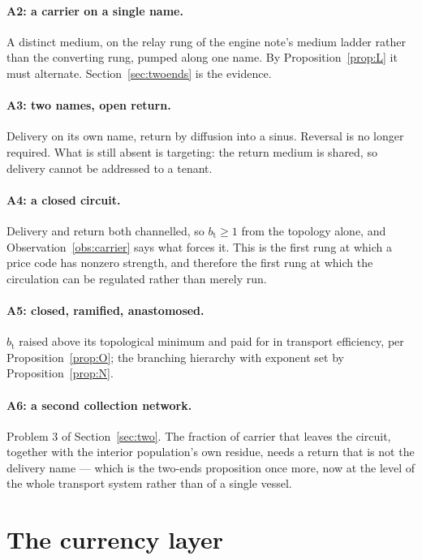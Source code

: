 \documentclass[11pt]{article}
\theoremstyle{plain}
\theoremstyle{definition}
\newcommand{\bt}{b_{\mathrm{t}}}
\begin{document}
\paragraph{A2: a carrier on a single name.} A distinct medium, on the relay rung of the engine note's
medium ladder rather than the converting rung, pumped along one name. By Proposition~\ref{prop:L} it
must alternate. Section~\ref{sec:twoends} is the evidence.

\paragraph{A3: two names, open return.} Delivery on its own name, return by diffusion into a sinus.
Reversal is no longer required. What is still absent is targeting: the return medium is shared, so
delivery cannot be addressed to a tenant.

\paragraph{A4: a closed circuit.} Delivery and return both channelled, so $\bt \geq 1$ from the
topology alone, and Observation~\ref{obs:carrier} says what forces it. This is the first rung at
which a price code has nonzero strength, and therefore the first rung at which the circulation can be
regulated rather than merely run.

\paragraph{A5: closed, ramified, anastomosed.} $\bt$ raised above its topological minimum and paid for
in transport efficiency, per Proposition~\ref{prop:O}; the branching hierarchy with exponent set by
Proposition~\ref{prop:N}.

\paragraph{A6: a second collection network.} Problem 3 of Section~\ref{sec:two}. The fraction of
carrier that leaves the circuit, together with the interior population's own residue, needs a return
that is not the delivery name --- which is the two-ends proposition once more, now at the level of
the whole transport system rather than of a single vessel.

\section{The currency layer}
\label{sec:currency}
\end{document}
